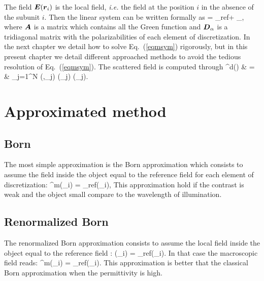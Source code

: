The field $\boldsymbol{E}(\boldsymbol{r}_i)$ is the local field, {\it i.e.}  the field
at the position $i$ in the absence of the subunit $i$. Then the linear
system can be written formally as
\be {} =  _{\rm ref}+  _\alpha {}, \label{eqmsym}\ee
where $\boldsymbol{A}$ is a matrix which contains all the Green function and
$\boldsymbol{D}_\alpha$ is a tridiagonal matrix with the polarizabilities of
each element of discretization. In the next chapter we detail how to
solve Eq.~(\ref{eqmsym}) rigorously, but in this present chapter we
detail different approached methods to avoid the tedious resolution of
Eq.~(\ref{eqmsym}).  The scattered field is computed through
\be{}^{\rm d}() & = & \sum_{j=1}^N (,_j)
\alpha(_j) (_j). \ee



\section{Approximated method}


\subsection{Born}


The most simple approximation is the Born approximation which consists
to assume the field inside the object equal to the reference field for
each element of discretization:
\be {}^{\rm m}(_i) = _{\rm ref}(_i), \ee
This approximation hold if the contrast is weak and the object small
compare to the wavelength of illumination.


\subsection{Renormalized Born }

The renormalized Born approximation consists to assume the local field
inside the object equal to the reference field :
\be {}(_i) = _{\rm ref}(_i). \ee
In that case the macroscopic field reads:
\be {}^{\rm m}(_i) = 
_{\rm ref}(_i). \ee
This approximation is better that the classical Born approximation
when the permittivity is high.


